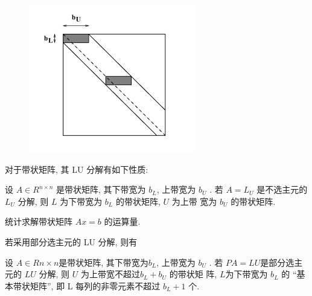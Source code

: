 \documentclass[12pt,a4paper]{article}
\begin{document}
\begin{figure}[h]%
	\centering  %
	\includegraphics[width=0.7\linewidth]{figures/Figure_7.png}  %
	\caption{}  %
	\label{fig:mcmthesis-logo}   %
\end{figure}

对于带状矩阵, 其 LU 分解有如下性质:
\begin{framed}
	\begin{theorem}
	设 $A ∈ R^{n×n}$ 是带状矩阵, 其下带宽为 $b_L$, 上带宽为 $b_U$ . 若 $A =
	L_U$ 是不选主元的 $L_U$ 分解, 则 $L$ 为下带宽为 $b_L$ 的带状矩阵, $U$ 为上带
	宽为 $b_U$ 的带状矩阵.	
	\end{theorem}
\end{framed}

统计求解带状矩阵 $Ax = b$ 的运算量.

若采用部分选主元的 LU 分解, 则有
\begin{framed}
	\begin{theorem}
		设 $A ∈ R
		n×n $是带状矩阵, 其下带宽为$ b_L$, 上带宽为 $b_U$ . 若 $P A =
		LU $是部分选主元的 $LU$ 分解, 则 $U$ 为上带宽不超过$b_L + b_U$ 的带状矩
		阵, $L $为下带宽为 $b_L$ 的 “基本带状矩阵”, 即 L 每列的非零元素不超过
		$b_L + 1$ 个.
	\end{theorem}
\end{framed}
\end{document}
